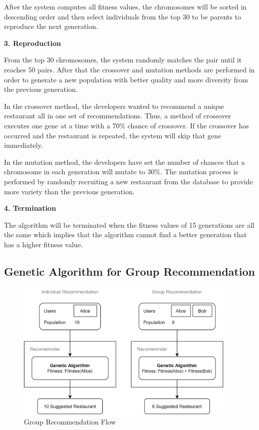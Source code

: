 \documentclass[12pt,oneside,openright,a4paper]{cpe-english-project}
\begin{document}
After the system computes all fitness values, the chromosomes will be sorted in descending order and then select individuals from the top 30 to be parents to reproduce the next generation.

\textbf{3. Reproduction}\par

From the top 30 chromosomes, the system randomly matches the pair until it reaches 50 pairs. After that the crossover and mutation methods are performed in order to generate a new population with better quality and more diversity from the previous generation.

In the crossover method, the developers wanted to recommend a unique restaurant all in one set of recommendations. Thus, a method of crossover executes one gene at a time with a 70\% chance of crossover. If the crossover has occurred and the restaurant is repeated, the system will skip that gene immediately.

In the mutation method, the developers have set the number of chances that a chromosome in each generation will mutate to 30\%. The mutation process is performed by randomly recruiting a new restaurant from the database to provide more variety than the previous generation.

\textbf{4. Termination}\par

The algorithm will be terminated when the fitness values of 15 generations are all the same which implies that the algorithm cannot find a better generation that has a higher fitness value.

\subsection{Genetic Algorithm for Group Recommendation}

\begin{figure}[H]\centering
\includegraphics[width=300pt]{./images/3ga_grouprecflow.png}
\caption{Group Recommendation Flow}\label{fig:3ga_grouprecflow}
\end{figure}
\end{document}
